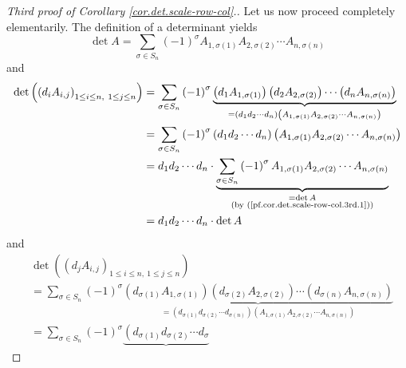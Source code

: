 \begin{proof}
[Third proof of Corollary \ref{cor.det.scale-row-col}.]Let us now proceed
completely elementarily. The definition of a determinant yields%
\begin{equation}
\det A=\sum_{\sigma\in S_{n}}\left(  -1\right)  ^{\sigma}A_{1,\sigma\left(
1\right)  }A_{2,\sigma\left(  2\right)  }\cdots A_{n,\sigma\left(  n\right)  }
\label{pf.cor.det.scale-row-col.3rd.1}%
\end{equation}
and%
\begin{align*}
\det\left(  \left(  d_{i}A_{i,j}\right)  _{1\leq i\leq n,\ 1\leq j\leq
n}\right)   &  =\sum_{\sigma\in S_{n}}\left(  -1\right)  ^{\sigma
}\underbrace{\left(  d_{1}A_{1,\sigma\left(  1\right)  }\right)  \left(
d_{2}A_{2,\sigma\left(  2\right)  }\right)  \cdots\left(  d_{n}A_{n,\sigma
\left(  n\right)  }\right)  }_{=\left(  d_{1}d_{2}\cdots d_{n}\right)  \left(
A_{1,\sigma\left(  1\right)  }A_{2,\sigma\left(  2\right)  }\cdots
A_{n,\sigma\left(  n\right)  }\right)  }\\
&  =\sum_{\sigma\in S_{n}}\left(  -1\right)  ^{\sigma}\left(  d_{1}d_{2}\cdots
d_{n}\right)  \left(  A_{1,\sigma\left(  1\right)  }A_{2,\sigma\left(
2\right)  }\cdots A_{n,\sigma\left(  n\right)  }\right) \\
&  =d_{1}d_{2}\cdots d_{n}\cdot\underbrace{\sum_{\sigma\in S_{n}}\left(
-1\right)  ^{\sigma}A_{1,\sigma\left(  1\right)  }A_{2,\sigma\left(  2\right)
}\cdots A_{n,\sigma\left(  n\right)  }}_{\substack{=\det A\\\text{(by
(\ref{pf.cor.det.scale-row-col.3rd.1}))}}}\\
&  =d_{1}d_{2}\cdots d_{n}\cdot\det A
\end{align*}
and%
\begin{align*}
&  \det\left(  \left(  d_{j}A_{i,j}\right)  _{1\leq i\leq n,\ 1\leq j\leq
n}\right) \\
&  =\sum_{\sigma\in S_{n}}\left(  -1\right)  ^{\sigma}\underbrace{\left(
d_{\sigma\left(  1\right)  }A_{1,\sigma\left(  1\right)  }\right)  \left(
d_{\sigma\left(  2\right)  }A_{2,\sigma\left(  2\right)  }\right)
\cdots\left(  d_{\sigma\left(  n\right)  }A_{n,\sigma\left(  n\right)
}\right)  }_{=\left(  d_{\sigma\left(  1\right)  }d_{\sigma\left(  2\right)
}\cdots d_{\sigma\left(  n\right)  }\right)  \left(  A_{1,\sigma\left(
1\right)  }A_{2,\sigma\left(  2\right)  }\cdots A_{n,\sigma\left(  n\right)
}\right)  }\\
&  =\sum_{\sigma\in S_{n}}\left(  -1\right)  ^{\sigma}\underbrace{\left(
d_{\sigma\left(  1\right)  }d_{\sigma\left(  2\right)  }\cdots d_{\sigma
}}
\end{align*}
\end{proof}
